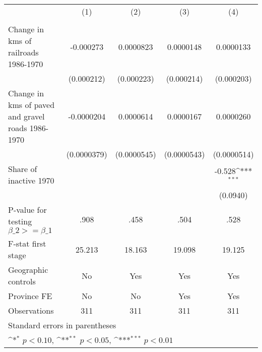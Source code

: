 {
\def\sym#1{\ifmmode^{#1}\else\(^{#1}\)\fi}
\begin{tabular}{l*{4}{c}}
\hline\hline
                &\multicolumn{1}{c}{(1)}&\multicolumn{1}{c}{(2)}&\multicolumn{1}{c}{(3)}&\multicolumn{1}{c}{(4)}\\
                &\multicolumn{1}{c}{}&\multicolumn{1}{c}{}&\multicolumn{1}{c}{}&\multicolumn{1}{c}{}\\
\hline
Change in kms of railroads 1986-1970&-0.000273         &0.0000823         &0.0000148         &0.0000133         \\
                &(0.000212)         &(0.000223)         &(0.000214)         &(0.000203)         \\
[1em]
Change in kms of paved and gravel roads 1986-1970&-0.0000204         &0.0000614         &0.0000167         &0.0000260         \\
                &(0.0000379)         &(0.0000545)         &(0.0000543)         &(0.0000514)         \\
[1em]
Share of inactive 1970&                  &                  &                  &   -0.528\sym{***}\\
                &                  &                  &                  & (0.0940)         \\
\hline
P-value for testing $\beta\_{2} >= \beta\_{1}$&     .908         &     .458         &     .504         &     .528         \\
F-stat first stage&   25.213         &   18.163         &   19.098         &   19.125         \\
Geographic controls&       No         &      Yes         &      Yes         &      Yes         \\
Province FE     &       No         &       No         &      Yes         &      Yes         \\
Observations    &      311         &      311         &      311         &      311         \\
\hline\hline
\multicolumn{5}{l}{\footnotesize Standard errors in parentheses}\\
\multicolumn{5}{l}{\footnotesize \sym{*} \(p<0.10\), \sym{**} \(p<0.05\), \sym{***} \(p<0.01\)}\\
\end{tabular}
}
